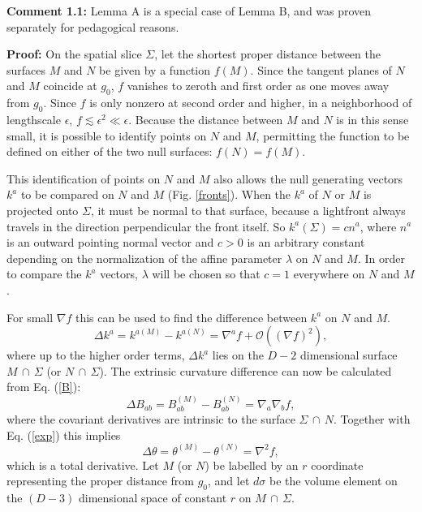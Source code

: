 \documentclass[12pt]{article}
\begin{document}
\textbf{Comment 1.1:} Lemma A is a special case of Lemma B, and was proven separately for pedagogical reasons.

\textbf{Proof:} On the spatial slice $\Sigma$, let the shortest proper distance between the surfaces $M$ and $N$ be given by a function $f(M)$.  Since the tangent planes of $N$ and $M$ coincide at $g_0$, $f$ vanishes to zeroth and first order as one moves away from $g_0$.  Since $f$ is only nonzero at second order and higher, in a neighborhood of lengthscale $\epsilon$, $f \apprle \epsilon^2 \ll \epsilon$.  Because the distance between $M$ and $N$ is in this sense small, it is possible to identify points on $N$ and $M$, permitting the function to be defined on either of the two null surfaces: $f(N) = f(M)$.

This identification of points on $N$ and $M$ also allows the null generating vectors $k^a$ to be compared on $N$ and $M$ (Fig. \ref{fronts}).  When the $k^a$ of $N$ or $M$ is projected onto $\Sigma$, it must be normal to that surface, because a lightfront always travels in the direction perpendicular the front itself.  So $k^a(\Sigma) = c n^a$, where $n^a$ is an outward pointing normal vector and $c > 0$ is an arbitrary constant depending on the normalization of the affine parameter $\lambda$ on $N$ and $M$.  In order to compare the $k^a$ vectors, $\lambda$ will be chosen so that $c = 1$ everywhere on $N$ and $M$.

For small $\nabla f$ this can be used to find the difference between $k^a$ on $N$ and $M$.
\begin{equation}
\Delta k^a = k^{a(M)} - k^{a(N)} = \nabla^a f + \mathcal{O}((\nabla f)^2),
\end{equation}
where up to the higher order terms, $\Delta k^a$ lies on the $D-2$ dimensional surface $M\,\cap\,\Sigma$ (or $N\,\cap\, \Sigma$).  The extrinsic curvature difference can now be calculated from Eq. (\ref{B}):
\begin{equation}
\Delta B_{ab} = B_{ab}^{(M)} - B_{ab}^{(N)} = \nabla_a \nabla_b f,
\end{equation}
where the covariant derivatives are intrinsic to the surface $\Sigma\,\cap\,N$.  Together with Eq. (\ref{exp}) this implies
\begin{equation}
\Delta \theta = \theta^{(M)} - \theta^{(N)} = \nabla^2 f,
\end{equation}
which is a total derivative.  Let $M$ (or $N$) be labelled by an $r$ coordinate representing the proper distance from $g_0$, and let $d\sigma$ be the volume element on the $(D - 3)$ dimensional space of constant $r$ on $M\,\cap\,\Sigma$.  
\end{document}
